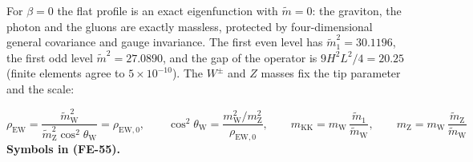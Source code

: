 \documentclass[
  10pt,
]{article}
\begin{document}
For \(\beta = 0\) the flat profile is an exact eigenfunction with
\(\tilde m = 0\): the graviton, the photon and the gluons are exactly
massless, protected by four-dimensional general covariance and gauge
invariance. The first even level has \(\tilde m_1^2 = 30.1196\), the
first odd level \(\tilde m^2 = 27.0890\), and the gap of the operator is
\(9H^2L^2/4 = 20.25\) (finite elements agree to \(5\times10^{-10}\)).
The \(W^\pm\) and \(Z\) masses fix the tip parameter and the scale:

\[
\rho_{\mathrm{EW}} = \frac{\tilde m_{\mathrm{W}}^2}{\tilde m_{\mathrm{Z}}^2\cos^2\theta_{\mathrm{W}}} =
 \rho_{\mathrm{EW},0},\qquad
\cos^2\theta_{\mathrm{W}} = \frac{m_{\mathrm{W}}^2/m_{\mathrm{Z}}^2}{\rho_{\mathrm{EW},0}},\qquad
m_{\mathrm{KK}} = m_{\mathrm{W}}\,\frac{\tilde m_1}{\tilde m_{\mathrm{W}}},\qquad
m_{\mathrm{Z}} = m_{\mathrm{W}}\,\frac{\tilde m_{\mathrm{Z}}}{\tilde m_{\mathrm{W}}} \tag{FE-55}
\] \textbf{Symbols in (FE-55).}
\end{document}
